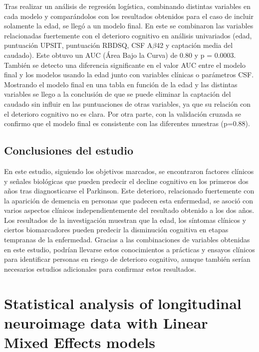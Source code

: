 	Tras realizar un análisis de regresión logística, combinando distintas variables en cada modelo y comparándolos con los resultados obtenidos para el caso de incluir solamente la edad, se llegó a un modelo final. En este se combinaron las variables relacionadas fuertemente con el deterioro cognitivo en análisis univariados (edad, puntuación UPSIT, puntuación RBDSQ, CSF A$\beta$42 y captación media del caudado). Este obtuvo un AUC (Área Bajo la Curva) de 0.80 y p = 0.0003. También se detecto una diferencia significante en el valor AUC entre el modelo final y los modelos usando la edad junto con variables clínicas o parámetros CSF. Mostrando el modelo final en una tabla en función de la edad y las distintas variables se llego a la conclusión de que se puede eliminar la captación del caudado sin influir en las puntuaciones de otras variables, ya que su relación con el deterioro cognitivo no es clara. Por otra parte, con la validación cruzada se confirmo que el modelo final es consistente con las diferentes muestras (p=0.88).\\
	
	\subsection{Conclusiones del estudio}
	
	En este estudio, siguiendo los objetivos marcados, se encontraron factores clínicos y señales biológicas que pueden predecir el decline cognitivo en los primeros dos años tras diagnosticarse el Parkinson. Este deterioro, relacionado fuertemente con la aparición de demencia en personas que padecen esta enfermedad, se asoció con varios aspectos clínicos independientemente del resultado obtenido a los dos años. Los resultados de la investigación muestran que la edad, los síntomas clínicos y ciertos biomarcadores pueden predecir la disminución cognitiva en etapas tempranas de la enfermedad. Gracias a las combinaciones de variables obtenidas en este estudio, podrían llevarse estos conocimientos a prácticas y ensayos clínicos para identificar personas en riesgo de deterioro cognitivo, aunque también serían necesarios estudios adicionales para confirmar estos resultados.\\
	
	
	
	
	\section{Statistical analysis of longitudinal neuroimage data with Linear Mixed Effects models}
	
